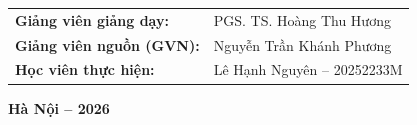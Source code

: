 \begin{titlepage}
    \vspace{1.8cm}
    
    \begin{flushleft}
        \hspace{2.0cm} 
        \begin{tabular}{ll}
            \fontsize{12}{14}\selectfont\textbf{Giảng viên giảng dạy:} & \fontsize{12}{14}\selectfont PGS. TS. Hoàng Thu Hương \\
            \fontsize{12}{14}\selectfont\textbf{Giảng viên nguồn (GVN):} & \fontsize{12}{14}\selectfont Nguyễn Trần Khánh Phương \\
            \fontsize{12}{14}\selectfont\textbf{Học viên thực hiện:} & \fontsize{12}{14}\selectfont Lê Hạnh Nguyên -- 20252233M
        \end{tabular}
    \end{flushleft}
    
    \vfill
    
    {\fontsize{12}{14}\selectfont\textbf{Hà Nội -- 2026}\\}
    \vspace*{0.4cm}
    
\end{titlepage}


